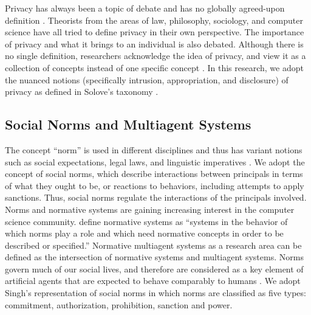 \documentclass[11pt,          %
               phd,           %
               onehalfspacing %
               ]{ncsuthesis}
\begin{document}
Privacy has always been a topic of debate and has no globally
agreed-upon definition \citep{smith2007privacy}. Theorists from the
areas of law, philosophy, sociology, and computer science have all tried
to define privacy in their own perspective.
%
%
The importance of privacy and what it brings to an individual is also
debated. Although there is no single definition, researchers 
acknowledge the idea of privacy, and view it as a
collection of concepts instead of one specific concept
\citep{smith2007privacy}. In this research, we adopt the nuanced notions
(specifically intrusion, appropriation, and disclosure) of privacy as
defined in Solove's taxonomy \citep{solove-2006-taxonomy}.

\subsection{Social Norms and Multiagent Systems}

The concept ``norm'' is used in different disciplines and thus has
variant notions such as social expectations, legal laws, and linguistic
imperatives \citep{Boella2009NormativeSystems}. We adopt the concept of
social norms, which describe interactions between principals in terms of
what they ought to be, or reactions to behaviors, including attempts to
apply sanctions. Thus, social norms regulate the interactions of the
principals involved. Norms and normative systems are gaining increasing
interest in the computer science community. \citet{Meyer+Wieringa-93}
define normative systems as ``systems in the behavior of which norms
play a role and which need normative concepts in order to be described
or specified.'' Normative multiagent systems as a research area can be
defined as the intersection of normative systems and multiagent systems.
Norms govern much of our social lives, and therefore are considered as a
key element of artificial agents that are expected to behave comparably
to humans \citep{Boella2006NormativeSystems}. We adopt Singh's
\citep{Singh-2013-Norms} representation of social norms in which norms
are classified as five types: commitment, authorization, prohibition,
sanction and power.
\end{document}
